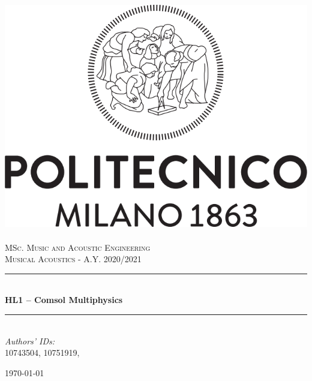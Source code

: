\documentclass[a4paper]{article}
\title{}
\author{}
\begin{document}
\begin{titlepage}	
	\newcommand{\HRule}{\rule{\linewidth}{0.5mm}} %
	
	\center %
	
	
	\includegraphics[width=.4\textwidth]{Logo_Politecnico_Milano.png}\\[0.4cm]
	\textsc{\LARGE}\\[0.3cm] %
	
	\textsc{\large MSc. Music and Acoustic Engineering}\\[1cm] %
	
	\textsc{\Large Musical Acoustics - A.Y. 2020/2021}\\[0.5cm] %
	
	
	\HRule\\[0.4cm]
	
	{\huge\bfseries HL1 – Comsol Multiphysics }\\[0.4cm] %
	
	\HRule\\[1.5cm]
	
	
	
	{\large\textit{Authors' IDs:}}\\
	10743504, 10751919, %
	
	
	\vfill\vfill\vfill %
	
	{\large\today} %
	
	
	\vfill\vfill
	
	
	\vfill %
	
	
\end{titlepage}
\end{document}
